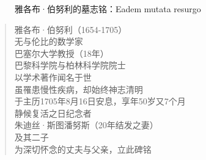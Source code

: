 \documentclass[b5paper]{ctexart}
\begin{document}
\begin{figure}[htbp]
 \centering
 \caption{雅各布·伯努利的墓志铭：Eadem mutata resurgo\cite{MacTour-Bernoulli-tomb}}
\end{figure}

\begin{mdframed}
\begin{verse}
雅各布·伯努利（1654-1705）\\
‌无与伦比的数学家‌\\
巴塞尔大学教授（18年）\\
巴黎科学院与柏林科学院院士\\
以学术著作闻名于世\\
虽罹患慢性疾病，却始终神志清明\\
于主历1705年8月16日安息，享年50岁又7个月\\
静候复活之日‌纪念者‌\\
朱迪丝·斯图潘努斯（20年结发之妻）\\
及其二子\\
为深切怀念的丈夫与父亲，立此碑铭
\end{verse}
\end{mdframed}
\end{document}
